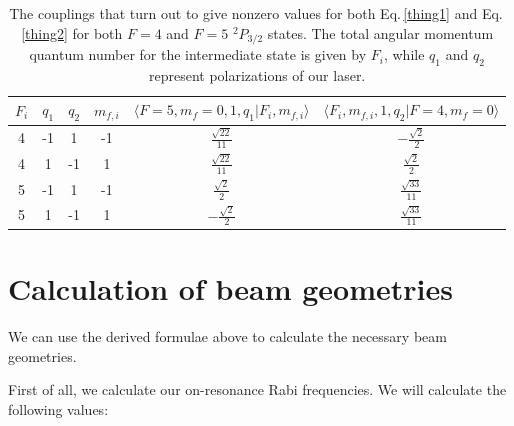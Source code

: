 \begin{table}[h!]
\centering
\begin{tabular}{|c|c|c|c|c|c|}
\hline
$F_i$ & $q_1$ & $q_2$ & $m_{f,i}$&$\langle F=5,m_f=0,1,q_1|F_i,m_{f,i}\rangle$&$\langle F_i,m_{f,i},1,q_2|F=4,m_f=0 \rangle$\\
\hline
4 & -1 & 1 & -1 &$ \frac{\sqrt{22}}{11} $&$ - \frac{\sqrt{2}}{2} $ \\ 
4 & 1 & -1 & 1 &$ \frac{\sqrt{22}}{11} $&$ \frac{\sqrt{2}}{2} $ \\ 
5 & -1 & 1 & -1 &$ \frac{\sqrt{2}}{2} $&$ \frac{\sqrt{33}}{11} $ \\ 
5 & 1 & -1 & 1 &$ - \frac{\sqrt{2}}{2} $&$ \frac{\sqrt{33}}{11} $ \\
\hline
\end{tabular}
\caption{The couplings that turn out to give nonzero values for both Eq.\,\eqref{thing1} and Eq.\,\eqref{thing2} for both $F=4$ and $F=5$ $^2P_{3/2}$ states. The total angular momentum quantum number for the intermediate state is given by $F_i$, while $q_1$ and $q_2$ represent polarizations of our laser.}
\label{nonzeroCG}
\end{table}

\section{Calculation of beam geometries}
We can use the derived formulae above to calculate the necessary beam geometries. %

First of all, we calculate our on-resonance Rabi frequencies. We will calculate the following values:

